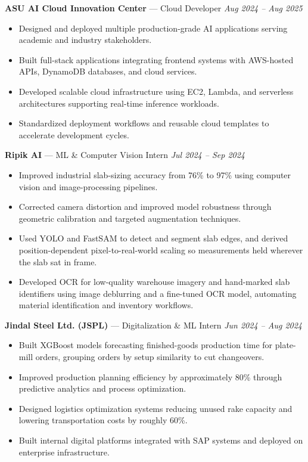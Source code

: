 \documentclass[a4paper,8pt]{extarticle}
\begin{document}
\noindent
\textbf{ASU AI Cloud Innovation Center} --- Cloud Developer
\hfill \textit{Aug 2024 -- Aug 2025}

\begin{itemize}
\item Designed and deployed multiple production-grade AI applications serving academic and industry stakeholders.
\item Built full-stack applications integrating frontend systems with AWS-hosted APIs, DynamoDB databases, and cloud services.
\item Developed scalable cloud infrastructure using EC2, Lambda, and serverless architectures supporting real-time inference workloads.
\item Standardized deployment workflows and reusable cloud templates to accelerate development cycles.
\end{itemize}

\noindent
\textbf{Ripik AI} --- ML \& Computer Vision Intern
\hfill \textit{Jul 2024 -- Sep 2024}

\begin{itemize}
\item Improved industrial slab-sizing accuracy from 76\% to 97\% using computer vision and image-processing pipelines.
\item Corrected camera distortion and improved model robustness through geometric calibration and targeted augmentation techniques.
\item Used YOLO and FastSAM to detect and segment slab edges, and derived position-dependent pixel-to-real-world scaling so measurements held wherever the slab sat in frame.
\item Developed OCR for low-quality warehouse imagery and hand-marked slab identifiers using image deblurring and a fine-tuned OCR model, automating material identification and inventory workflows.
\end{itemize}

\noindent
\textbf{Jindal Steel Ltd. (JSPL)} --- Digitalization \& ML Intern
\hfill \textit{Jun 2024 -- Aug 2024}

\begin{itemize}
\item Built XGBoost models forecasting finished-goods production time for plate-mill orders, grouping orders by setup similarity to cut changeovers.
\item Improved production planning efficiency by approximately 80\% through predictive analytics and process optimization.
\item Designed logistics optimization systems reducing unused rake capacity and lowering transportation costs by roughly 60\%.
\item Built internal digital platforms integrated with SAP systems and deployed on enterprise infrastructure.
\end{itemize}
\end{document}
